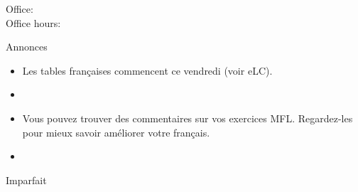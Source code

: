\documentclass{beamer}
\subtitle[Nature et imparfait]{La nature est l'imparfait}
\begin{document}
  \begin{frame}
    \titlepage
    \tiny{Office: \\
          Office hours: }
  \end{frame}

  \begin{frame}{Annonces}
    \begin{itemize}
      \item Les tables françaises commencent ce vendredi (voir eLC).
      \item[] 
      \item Vous pouvez trouver des commentaires sur vos exercices MFL. Regardez-les pour mieux savoir améliorer votre français.
      \item[] 
    \end{itemize}
  \end{frame}

  \begin{frame}{Imparfait}
    \begin{center}
      
    \end{center}
  \end{frame}
\end{document}
